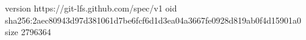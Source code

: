 version https://git-lfs.github.com/spec/v1
oid sha256:2aec80943d97d381061d7be6fcf6d1d3ea04a3667fe0928d819ab0f4d15901a0
size 2796364
